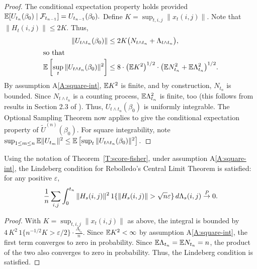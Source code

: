 \documentclass[final]{statsoc}
\begin{document}
\begin{proof}
The conditional expectation property holds provided
\(
    \mathbb{E}[ U_{t_{n}}(\beta_0) \mid \mathcal{F}_{t_{n-1}} ]
        = U_{t_{n-1}}(\beta_0).
\)
Define $K = \sup_{t,i,j} \| x_{t}(i,j) \|$.
Note that $\|H_{t}(i,j)\| \leq 2 K$.  Thus,
\begin{align*}
    \| U_{t \wedge t_n} (\beta_0) \|
        &\leq
            2 K
            \big(
                N_{t \wedge t_n}
                +
                \Lambda_{t \wedge t_n}
            \big), \\
\intertext{so that}
    \mathbb{E} \left[
        \sup_t
        \| U_{t \wedge t_n} (\beta_0) \|^2
    \right]
        &\leq
            8 \cdot \big(\mathbb{E} K^2\big)^{1/2} \cdot
            \big(
              \mathbb{E} N_{t_n}^2
              +
              \mathbb{E} \Lambda_{t_n}^2
            \big)^{1/2}.
\end{align*}
By assumption A\ref{A:square-int}, $\mathbb{E} K^2$ is finite, and by construction,
$N_{t_n}$ is bounded.  Since $N_{t \wedge t_n}$ is a counting process,
$\mathbb{E} \Lambda_{t_n}^2$ is finite, too
(this follows from results in Section 2.3 of
\citet{fleming1991counting}).  Thus, $U_{t \wedge t_n}(\beta_0)$
is uniformly integrable.  The Optional Sampling Theorem now applies to
give the conditional expectation property of $\tilde U^{(n)}(\beta_0)$.  For
square integrability, note
\(
    \sup_{1 \leq m \leq n}
    \mathbb{E} \| U_{t_m} \|^2
        \leq
        \mathbb{E} \left[
           \sup_t
           \| U_{t \wedge t_n} (\beta_0) \|^2
        \right].
\)
\end{proof}

\begin{lemma}\label{L:Lindeberg-condition}
Using the notation of Theorem~\ref{T:score-fisher}, under assumption
A\ref{A:square-int}, the Lindeberg condition for Rebolledo's \citeyearpar{rebolledo1980central} Central Limit
Theorem is satisfied: for any positive $\varepsilon$,
\[
    \frac{1}{n}
    \sum_{i,j}
    \int_{0}^{t_n}
        \| H_s(i,j) \|^2
        \, 1\{\| H_s(i,j) \| > \sqrt{n} \varepsilon \}
        \, d\Lambda_s(i,j)
        \overset{\mathit{P}}{\to}
        0.
\]
\end{lemma}

\begin{proof}
With $K = \sup_{t,i,j} \| x_t(i,j)\|$ as above, the integral is bounded by
\(
    4 \, K^2 \, 1\{n^{-1/2} K > \varepsilon / 2\}
    \cdot
    \frac{\Lambda_{t_n}}{n}.
\)
Since $\mathbb{E} K^2 < \infty$ by assumption A\ref{A:square-int}, the first term
converges to zero in probability.  Since
$\mathbb{E} \Lambda_{t_n} = \mathbb{E} N_{t_n} = n$, the product of the two also
converges to zero in probability.  Thus, the Lindeberg condition is satisfied.
\end{proof}
\end{document}

